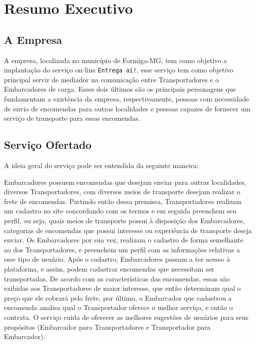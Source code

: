 \chapter{Resumo Executivo}
\label{cap:ResumoExecutivo}
	
		
		
	\section{A Empresa}
		A empresa, localizada no município de Formiga-MG, tem como objetivo a implantação do serviço on-line \texttt{Entrega aí!}, esse serviço tem como objetivo principal servir de mediador na comunicação entre Transportadores e o Embarcadores de carga. Esses dois últimos são os principais personagens que fundamentam a existência da empresa, respectivamente, pessoas com necessidade de envio de encomendas para outras localidades e pessoas capazes de fornecer um serviço de transporte para essas encomendas.
		
		
		\section{Serviço Ofertado}
		
		A ideia geral do serviço pode ser entendida da seguinte maneira: 
		
		Embarcadores possuem encomendas que desejam enviar para outras localidades, diversos Transportadores, com diversos meios de transporte desejam realizar o frete de encomendas. Partindo então dessa premissa, Transportadores realizam um cadastro no site concordando com os termos e em seguida preenchem seu perfil, ou seja, quais meios de transporte possui à disposição dos Embarcadores, categorias de encomendas que possui interesse ou experiência de transporte deseja enviar. Os Embarcadores por sua vez, realizam o cadastro de forma semelhante ao dos Transportadores, e preenchem um perfil com as informações relativas a esse tipo de usuário. Após o cadastro, Embarcadores passam a ter acesso à plataforma, e assim, podem cadastrar encomendas que necessitam ser transportadas. De acordo com as características das encomendas, essas são exibidas aos Transportadores de maior interesse, que então determinam qual o preço que ele cobrará pelo frete, por último, o Embarcador que cadastrou a encomenda analisa qual o Transportador oferece o melhor serviço, e então o contrata. O serviço cuida de oferecer as melhores sugestões de usuários para seus propósitos (Embarcador para Transportadores e Transportador para Embarcador).
		
